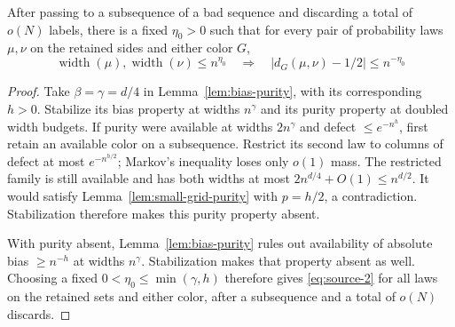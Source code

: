 \begin{corollary}\label{cor:initial-discrepancy}
After passing to a subsequence of a bad sequence and discarding a total
of \(o(N)\) labels, there is a fixed \(\eta_0>0\) such that
for every pair of probability laws \(\mu,\nu\) on the retained sides
and either color \(G\),
\begin{equation}
 \operatorname{width}(\mu),\operatorname{width}(\nu)\le n^{\eta_0}
 \quad\Longrightarrow\quad
 |d_G(\mu,\nu)-1/2|\le n^{-\eta_0} \label{eq:source-2}
\end{equation}
\end{corollary}

\begin{proof}
Take \(\beta=\gamma=d/4\) in Lemma~\ref{lem:bias-purity}, with its
corresponding \(h>0\). Stabilize its bias property at widths
\(n^\gamma\) and its purity property at doubled width budgets. If purity were available at widths
\(2n^\gamma\) and defect \(\le e^{-n^h}\), first retain an available
color on a subsequence. Restrict its second law to columns of defect at
most \(e^{-n^{h/2}}\); Markov's inequality loses only \(o(1)\) mass.
The restricted family is still available and has both widths at most
\(2n^{d/4}+O(1)\le n^{d/2}\). It would satisfy
Lemma~\ref{lem:small-grid-purity} with \(p=h/2\), a contradiction.
Stabilization therefore makes this purity property absent.

With purity absent, Lemma~\ref{lem:bias-purity} rules out availability
of absolute bias \(\ge n^{-h}\) at widths \(n^\gamma\). Stabilization
makes that property absent as well. Choosing a fixed
\(0<\eta_0\le\min(\gamma,h)\) therefore gives
\eqref{eq:source-2} for all laws on the retained sets and either color,
after a subsequence and a total of \(o(N)\) discards.
\end{proof}
